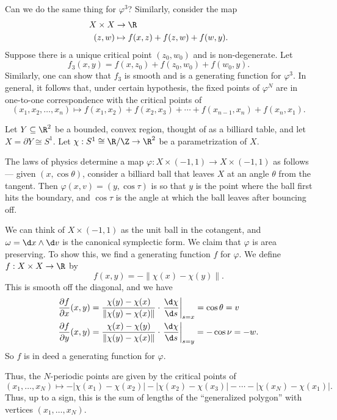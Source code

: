 \documentclass[a4paper]{article}
\begin{document}
Can we do the same thing for $\varphi^3$? Similarly, consider the map
\begin{align*}
  X \times X &\to \R\\
  (z, w) &\mapsto f(x, z) + f(z, w) + f(w, y).
\end{align*}
Suppose there is a unique critical point $(z_0, w_0)$ and is non-degenerate. Let
\[
  f_3(x, y) = f(x, z_0) + f(z_0, w_0) + f(w_0, y).
\]
Similarly, one can show that $f_3$ is smooth and is a generating function for $\varphi^3$. In general, it follows that, under certain hypothesis, the fixed points of $\varphi^N$ are in one-to-one correspondence with the critical points of
\[
  (x_1, x_2, \ldots, x_n) \mapsto f(x_1, x_2) + f(x_2, x_3) + \cdots + f(x_{n - 1}, x_n) + f(x_n, x_1).
\]
\begin{eg}
  Let $Y \subseteq \R^2$ be a bounded, convex region, thought of as a billiard table, and let $X = \partial Y \cong S^1$. Let $\chi: S^1 \cong \R/\Z \to \R^2$ be a parametrization of $X$.

  The laws of physics determine a map $\varphi: X \times (-1, 1) \to X \times (-1, 1)$ as follows --- given $(x, \cos \theta)$, consider a billiard ball that leaves $X$ at an angle $\theta$ from the tangent. Then $\varphi(x, v) = (y, \cos \tau)$ is so that $y$ is the point where the ball first hits the boundary, and $\cos \tau$ is the angle at which the ball leaves after bouncing off.

  We can think of $X \times (-1, 1)$ as the unit ball in the cotangent, and $\omega = \d x \wedge \d v$ is the canonical symplectic form. We claim that $\varphi$ is area preserving. To show this, we find a generating function $f$ for $\varphi$. We define $f: X \times X \to \R$ by
  \[
    f(x, y) = - \|\chi(x) - \chi(y)\|.
  \]
  This is smooth off the diagonal, and we have
  \begin{align*}
    \frac{\partial f}{\partial x}(x, y) &= \frac{\chi(y) - \chi(x)}{\|\chi(y) - \chi(x)\|} \cdot \left. \frac{\d \chi}{\d s} \right|_{s = x} = \cos \theta = v\\
    \frac{\partial f}{\partial y}(x, y) &= \frac{\chi(x) - \chi(y)}{\|\chi(y) - \chi(x)\|} \cdot \left. \frac{\d \chi}{\d s} \right|_{s = y} = - \cos \nu = -w.
  \end{align*}
  So $f$ is in deed a generating function for $\varphi$.

  Thus, the $N$-periodic points are given by the critical points of
  \[
    (x_1, \ldots, x_N) \mapsto - |\chi(x_1) - \chi(x_2)| - |\chi(x_2) - \chi(x_3)| - \cdots - |\chi(x_N) - \chi(x_1)|.
  \]
  Thus, up to a sign, this is the sum of lengths of the ``generalized polygon'' with vertices $(x_1, \ldots, x_N)$.
\end{eg}
\end{document}
